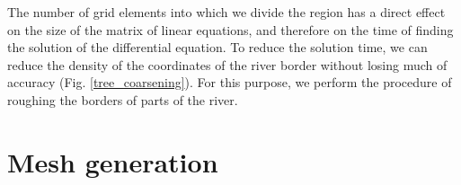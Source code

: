 \documentclass[]{pracamgr}
\begin{document}
      The number of grid elements into which we divide the region has a direct effect on the size of the matrix of linear equations, and therefore on the time of finding the solution of the differential equation. To reduce the solution time, we can reduce the density of the coordinates of the river border without losing much of accuracy (Fig. \ref{tree_coarsening}). For this purpose, we perform the procedure of roughing the borders of parts of the river. 

    \section{Mesh generation}
\end{document}

